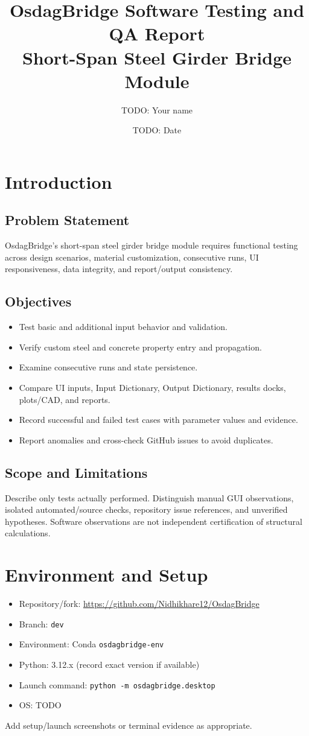 \documentclass[11pt,a4paper]{report}
\title{\textbf{OsdagBridge Software Testing and QA Report}\\
\large Short-Span Steel Girder Bridge Module}
\author{TODO: Your name}
\date{TODO: Date}
\begin{document}
\maketitle
\tableofcontents
\chapter{Introduction}
\section{Problem Statement}
OsdagBridge's short-span steel girder bridge module requires functional testing across design scenarios, material customization, consecutive runs, UI responsiveness, data integrity, and report/output consistency.

\section{Objectives}
\begin{itemize}
\item Test basic and additional input behavior and validation.
\item Verify custom steel and concrete property entry and propagation.
\item Examine consecutive runs and state persistence.
\item Compare UI inputs, Input Dictionary, Output Dictionary, results docks, plots/CAD, and reports.
\item Record successful and failed test cases with parameter values and evidence.
\item Report anomalies and cross-check GitHub issues to avoid duplicates.
\end{itemize}

\section{Scope and Limitations}
Describe only tests actually performed. Distinguish manual GUI observations, isolated automated/source checks, repository issue references, and unverified hypotheses. Software observations are not independent certification of structural calculations.

\chapter{Environment and Setup}
\begin{itemize}
\item Repository/fork: \url{https://github.com/Nidhikhare12/OsdagBridge}
\item Branch: \texttt{dev}
\item Environment: Conda \texttt{osdagbridge-env}
\item Python: 3.12.x (record exact version if available)
\item Launch command: \texttt{python -m osdagbridge.desktop}
\item OS: TODO
\end{itemize}
Add setup/launch screenshots or terminal evidence as appropriate.
\end{document}
